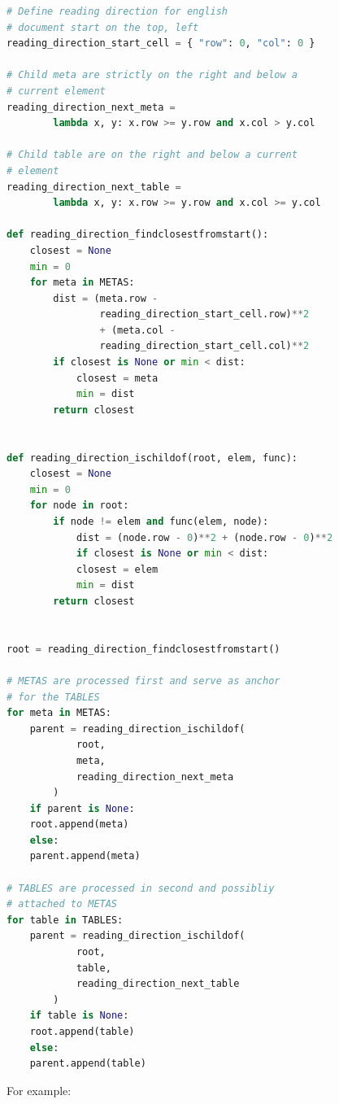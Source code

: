 \documentclass{article}
\begin{document}
\begin{lstlisting}[language=Python, caption=Tree Structure]
# Define reading direction for english
# document start on the top, left
reading_direction_start_cell = { "row": 0, "col": 0 }

# Child meta are strictly on the right and below a
# current element
reading_direction_next_meta =
        lambda x, y: x.row >= y.row and x.col > y.col

# Child table are on the right and below a current
# element
reading_direction_next_table =
        lambda x, y: x.row >= y.row and x.col >= y.col

def reading_direction_findclosestfromstart():
    closest = None
    min = 0
    for meta in METAS:
        dist = (meta.row -
                reading_direction_start_cell.row)**2
                + (meta.col -
                reading_direction_start_cell.col)**2
        if closest is None or min < dist:
            closest = meta
            min = dist
        return closest


def reading_direction_ischildof(root, elem, func):
    closest = None
    min = 0
    for node in root:
        if node != elem and func(elem, node):
            dist = (node.row - 0)**2 + (node.row - 0)**2
            if closest is None or min < dist:
            closest = elem
            min = dist
        return closest


root = reading_direction_findclosestfromstart()

# METAS are processed first and serve as anchor
# for the TABLES
for meta in METAS:
    parent = reading_direction_ischildof(
            root,
            meta,
            reading_direction_next_meta
        )
    if parent is None:
    root.append(meta)
    else:
    parent.append(meta)

# TABLES are processed in second and possibliy
# attached to METAS
for table in TABLES:
    parent = reading_direction_ischildof(
            root,
            table,
            reading_direction_next_table
        )
    if table is None:
    root.append(table)
    else:
    parent.append(table)
\end{lstlisting}

For example:
\end{document}
